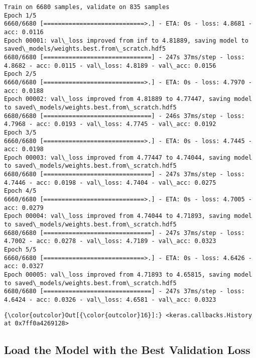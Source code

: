 \documentclass[11pt]{article}
\begin{document}
    \begin{Verbatim}[commandchars=\\\{\}]
Train on 6680 samples, validate on 835 samples
Epoch 1/5
6660/6680 [============================>.] - ETA: 0s - loss: 4.8681 - acc: 0.0116
Epoch 00001: val\_loss improved from inf to 4.81889, saving model to saved\_models/weights.best.from\_scratch.hdf5
6680/6680 [==============================] - 247s 37ms/step - loss: 4.8682 - acc: 0.0115 - val\_loss: 4.8189 - val\_acc: 0.0156
Epoch 2/5
6660/6680 [============================>.] - ETA: 0s - loss: 4.7970 - acc: 0.0188
Epoch 00002: val\_loss improved from 4.81889 to 4.77447, saving model to saved\_models/weights.best.from\_scratch.hdf5
6680/6680 [==============================] - 246s 37ms/step - loss: 4.7968 - acc: 0.0193 - val\_loss: 4.7745 - val\_acc: 0.0192
Epoch 3/5
6660/6680 [============================>.] - ETA: 0s - loss: 4.7445 - acc: 0.0198
Epoch 00003: val\_loss improved from 4.77447 to 4.74044, saving model to saved\_models/weights.best.from\_scratch.hdf5
6680/6680 [==============================] - 247s 37ms/step - loss: 4.7446 - acc: 0.0198 - val\_loss: 4.7404 - val\_acc: 0.0275
Epoch 4/5
6660/6680 [============================>.] - ETA: 0s - loss: 4.7005 - acc: 0.0279
Epoch 00004: val\_loss improved from 4.74044 to 4.71893, saving model to saved\_models/weights.best.from\_scratch.hdf5
6680/6680 [==============================] - 247s 37ms/step - loss: 4.7002 - acc: 0.0278 - val\_loss: 4.7189 - val\_acc: 0.0323
Epoch 5/5
6660/6680 [============================>.] - ETA: 0s - loss: 4.6426 - acc: 0.0327
Epoch 00005: val\_loss improved from 4.71893 to 4.65815, saving model to saved\_models/weights.best.from\_scratch.hdf5
6680/6680 [==============================] - 247s 37ms/step - loss: 4.6424 - acc: 0.0326 - val\_loss: 4.6581 - val\_acc: 0.0323

    \end{Verbatim}

\begin{Verbatim}[commandchars=\\\{\}]
{\color{outcolor}Out[{\color{outcolor}16}]:} <keras.callbacks.History at 0x7ff0a4269128>
\end{Verbatim}
            
    \subsection{Load the Model with the Best Validation
Loss}\label{load-the-model-with-the-best-validation-loss}
\end{document}
